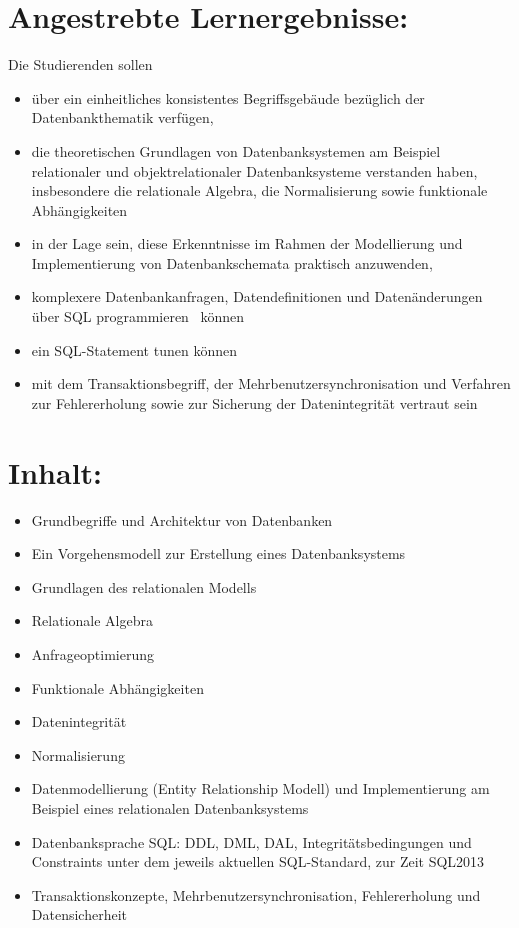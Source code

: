 \section*{Angestrebte
Lernergebnisse:}\label{angestrebte-lernergebnisse-7}

Die Studierenden sollen

\begin{itemize}
\tightlist
\item
  über ein einheitliches konsistentes Begriffsgebäude bezüglich der
  Datenbankthematik verfügen,
\item
  die theoretischen Grundlagen von Datenbanksystemen am Beispiel
  relationaler und objektrelationaler Datenbanksysteme verstanden haben,
  insbesondere die relationale Algebra, die Normalisierung sowie
  funktionale Abhängigkeiten
\item
  in der Lage sein, diese Erkenntnisse im Rahmen der Modellierung und
  Implementierung von Datenbankschemata praktisch anzuwenden,
\item
  komplexere Datenbankanfragen, Datendefinitionen und Datenänderungen
  über SQL programmieren~ können
\item
  ein SQL-Statement tunen können
\item
  mit dem Transaktionsbegriff, der Mehrbenutzersynchronisation und
  Verfahren zur Fehlererholung sowie zur Sicherung der Datenintegrität
  vertraut sein
\end{itemize}

\section*{Inhalt:}\label{inhalt-7}

\begin{itemize}
\tightlist
\item
  Grundbegriffe und Architektur von Datenbanken
\item
  Ein Vorgehensmodell zur Erstellung eines Datenbanksystems
\item
  Grundlagen des relationalen Modells
\item
  Relationale Algebra
\item
  Anfrageoptimierung
\item
  Funktionale Abhängigkeiten
\item
  Datenintegrität
\item
  Normalisierung
\item
  Datenmodellierung (Entity Relationship Modell) und Implementierung am
  Beispiel eines relationalen Datenbanksystems
\item
  Datenbanksprache SQL: DDL, DML, DAL, Integritätsbedingungen und
  Constraints unter dem jeweils aktuellen SQL-Standard, zur Zeit SQL2013
\item
  Transaktionskonzepte, Mehrbenutzersynchronisation, Fehlererholung und
  Datensicherheit
\end{itemize}

